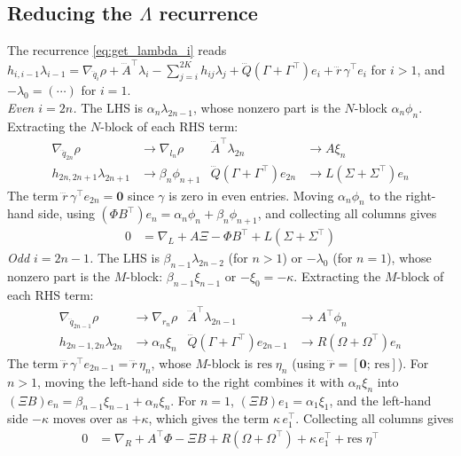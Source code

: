 \documentclass[a4paper,12pt]{article}
\theoremstyle{definition}
\begin{document}
\subsection{Reducing the $\Lambda$ recurrence}
The recurrence \eqref{eq:get_lambda_i} reads $h_{i,i-1}\lambda_{i-1} = \nabla_{\dddot{q}_i}\rho + \dddot{A}^\top \lambda_i - \sum_{j=i}^{2K} h_{ij}\lambda_j + \dddot{Q}(\Gamma + \Gamma^\top)e_i + \dddot{r}\,\gamma^\top e_i$ for $i > 1$, and $-\lambda_0 = (\cdots)$ for $i=1$.
\\[4pt]
\noindent\textit{Even $i = 2n$.} The LHS is $\alpha_n \lambda_{2n-1}$, whose nonzero part is the $N$-block $\alpha_n \phi_n$. Extracting the $N$-block of each RHS term:
\begin{align*}
    \nabla_{\dddot{q}_{2n}} \rho &\to \nabla_{l_n}\rho
    &
    \dddot{A}^\top \lambda_{2n} &\to A\xi_n
    \\
    h_{2n,2n+1}\lambda_{2n+1} &\to \beta_n \phi_{n+1}
    &
    \dddot{Q}(\Gamma + \Gamma^\top)e_{2n} &\to L(\Sigma + \Sigma^\top) e_n
\end{align*}
The term $\dddot{r}\,\gamma^\top e_{2n} = \mathbf{0}$ since $\gamma$ is zero in even entries. Moving $\alpha_n \phi_n$ to the right-hand side, using $(\Phi B^\top) e_n = \alpha_n \phi_n + \beta_n \phi_{n+1}$, and collecting all columns gives
\begin{align}
    0 &= \nabla_L + A\Xi - \Phi B^\top + L(\Sigma + \Sigma^\top) \label{eq:stable_Phi_recurrence}
\end{align}
\noindent\textit{Odd $i = 2n{-}1$.} The LHS is $\beta_{n-1}\lambda_{2n-2}$ (for $n > 1$) or $-\lambda_0$ (for $n = 1$), whose nonzero part is the $M$-block: $\beta_{n-1}\xi_{n-1}$ or $-\xi_0 = -\kappa$. Extracting the $M$-block of each RHS term:
\begin{align*}
    \nabla_{\dddot{q}_{2n-1}} \rho &\to \nabla_{r_n}\rho
    &
    \dddot{A}^\top \lambda_{2n-1} &\to A^\top \phi_n
    \\
    h_{2n-1,2n}\lambda_{2n} &\to \alpha_n \xi_n
    &
    \dddot{Q}(\Gamma + \Gamma^\top)e_{2n-1} &\to R(\Omega + \Omega^\top) e_n
\end{align*}
The term $\dddot{r}\,\gamma^\top e_{2n-1} = \dddot{r}\,\eta_n$, whose $M$-block is $\text{res}\;\eta_n$ (using $\dddot{r} = [\mathbf{0};\, \text{res}]$). For $n > 1$, moving the left-hand side to the right combines it with $\alpha_n \xi_n$ into $(\Xi B) e_n = \beta_{n-1} \xi_{n-1} + \alpha_n \xi_n$. For $n = 1$, $(\Xi B) e_1 = \alpha_1 \xi_1$, and the left-hand side $-\kappa$ moves over as $+\kappa$, which gives the term $\kappa\, e_1^\top$. Collecting all columns gives
\begin{align}
    0 &= \nabla_R + A^\top \Phi - \Xi B + R(\Omega + \Omega^\top) + \kappa\, e_1^\top + \text{res}\;\eta^\top \label{eq:stable_Xi_recurrence}
\end{align}
\end{document}

